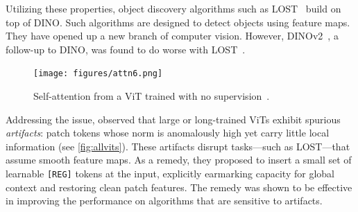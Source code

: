 \documentclass{article}
\newcommand{\RegTok}{\texttt{[REG]}\xspace}
\newcommand{\citet}{\textcite}
\newcommand{\citep}{\parencite}
\begin{document}
Utilizing these properties, object discovery algorithms such as LOST~\cite{simeoniLocalizingObjectsSelfsupervised2021} build on top of DINO. Such algorithms are designed to detect objects using feature maps. They have opened up a new branch of computer vision. However, DINOv2~\cite{oquabDINOv2LearningRobust2024}, a follow-up to DINO, was found to do worse with LOST~\cite{darcetVisionTransformersNeed2024}.

\begin{figure}[h]
    \centering
    \texttt{[image: figures/attn6.png]}
    \caption{Self-attention from a ViT trained with no supervision~\citep{caronEmergingPropertiesSelfsupervised2021}.}
    \label{fig:attn6}
\end{figure}

Addressing the issue, \citet{darcetVisionTransformersNeed2024} observed that large or long-trained ViTs exhibit spurious \emph{artifacts}: patch tokens whose norm is anomalously high yet carry little local information (see \cref{fig:allvits}). These artifacts disrupt tasks—such as LOST—that assume smooth feature maps. 
As a remedy, they proposed to insert a small set of learnable \RegTok tokens at the input, explicitly earmarking capacity for global context and restoring clean patch features.
The remedy was shown to be effective in improving the performance on algorithms that are sensitive to artifacts.
\end{document}

